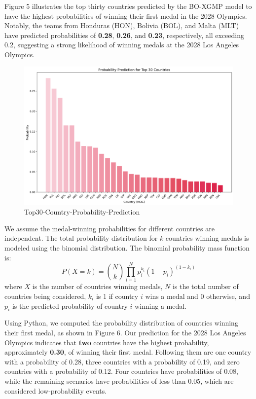 \documentclass[12pt]{article}  %
\begin{document}
\begin{enumerate}[\textbullet]
    Figure 5 illustrates the top thirty countries predicted by the BO-XGMP  model to have the highest probabilities of winning their first medal in the 2028 Olympics. Notably, the teams from Honduras (HON), Bolivia (BOL), and Malta (MLT) have predicted probabilities of \textbf{0.28}, \textbf{0.26}, and \textbf{0.23}, respectively, all exceeding 0.2, suggesting a strong likelihood of winning medals at the 2028 Los Angeles Olympics.
    
    \begin{figure}[H]
        \centering
        \includegraphics[width=0.6\linewidth]{Top30-Country-Probability-Prediction.png}
        \caption{Top30-Country-Probability-Prediction}
        \label{fig:enter-label}
    \end{figure}

    We assume the medal-winning probabilities for different countries are independent. The total probability distribution for $k$ countries winning medals is modeled using the binomial distribution. The binomial probability mass function is:
    \begin{equation}
        P(X = k) = \binom{N}{k} \prod_{i=1}^{N} p_i^{k_i} (1 - p_i)^{(1 - k_i)} \tag{17}
    \end{equation}
    where $X$ is the number of countries winning medals, $N$ is the total number of countries being considered, $k_i$ is 1 if country $i$ wins a medal and 0 otherwise, and $p_i$ is the predicted probability of country $i$ winning a medal. 

    Using Python, we computed the probability distribution of countries winning their first medal, as shown in Figure 6. Our prediction for the 2028 Los Angeles Olympics indicates that \textbf{two} countries have the highest probability, approximately \textbf{0.30}, of winning their first medal. Following them are one country with a probability of 0.28, three countries with a probability of 0.19, and zero countries with a probability of 0.12. Four countries have probabilities of 0.08, while the remaining scenarios have probabilities of less than 0.05, which are considered low-probability events.


\end{enumerate}
\end{document}
